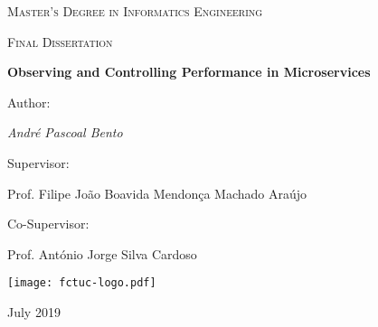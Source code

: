 \begin{titlepage}
	\centering
	{\scshape\LARGE Master’s Degree in Informatics Engineering \par}

	\vspace{0.2cm}
	{\scshape Final Dissertation\par}

	\vspace{1.5cm}
	{\huge\bfseries Observing and Controlling Performance in Microservices\par}

	\vspace{2cm}
	{Author:\par \Large\itshape André Pascoal Bento\par}

	\vfill
	Supervisor:\par
	\large Prof. Filipe João Boavida Mendonça Machado Araújo\par

	\vspace{0.5cm}
	Co-Supervisor:\par
	\large Prof. António Jorge Silva Cardoso\par

	\texttt{[image: fctuc-logo.pdf]}\par

	\vspace{0.5cm}
	\vfill

	{\Large July 2019\par}
\end{titlepage}